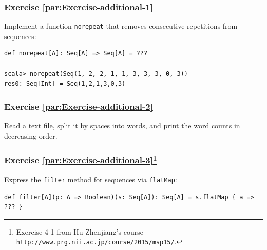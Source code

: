 \subsubsection{Exercise \label{par:Exercise-additional-1}\ref{par:Exercise-additional-1}}

Implement a function \lstinline!norepeat! that removes consecutive
repetitions from sequences:
\begin{lstlisting}
def norepeat[A]: Seq[A] => Seq[A] = ???

scala> norepeat(Seq(1, 2, 2, 1, 1, 3, 3, 3, 0, 3))
res0: Seq[Int] = Seq(1,2,1,3,0,3)
\end{lstlisting}


\subsubsection{Exercise \label{par:Exercise-additional-2}\ref{par:Exercise-additional-2}}

Read a text file, split it by spaces into words, and print the word
counts in decreasing order.%

\subsubsection{Exercise \label{par:Exercise-additional-3}\ref{par:Exercise-additional-3}\protect\footnote{Exercise 4-1 from Hu Zhenjiang\textsf{'}s course \texttt{\protect\href{http://www.prg.nii.ac.jp/course/2015/msp15/}{http://www.prg.nii.ac.jp/course/2015/msp15/}}.}}

Express the \lstinline!filter! method for sequences via \lstinline!flatMap!:
\begin{lstlisting}
def filter[A](p: A => Boolean)(s: Seq[A]): Seq[A] = s.flatMap { a => ??? }
\end{lstlisting}


